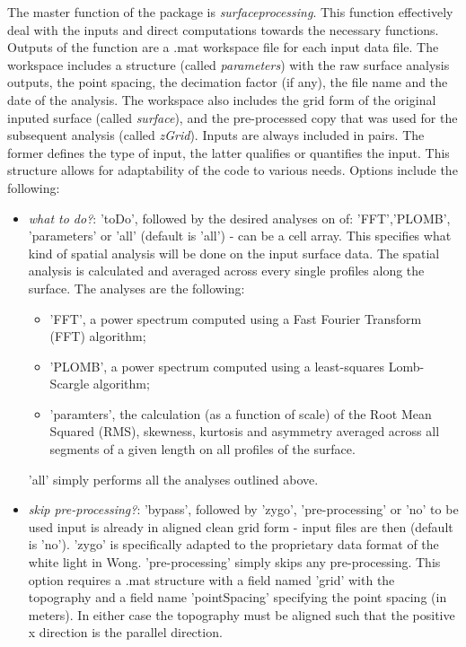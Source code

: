 \documentclass[12pt,a4paper]{article}
\begin{document}
\begin{itemize}
The master function of the package is \textit{surfaceprocessing}. This function effectively deal with the inputs and direct computations towards the necessary functions. Outputs of the function are a .mat workspace file for each input data file. The workspace includes a structure (called \textit{parameters}) with the raw surface analysis outputs, the point spacing, the decimation factor (if any), the file name and the date of the analysis. The workspace also includes the grid form of the original inputed surface (called \textit{surface}), and the pre-processed copy that was used for the subsequent analysis (called \textit{zGrid}).  Inputs are always included in pairs. The former defines the type of input, the latter qualifies or quantifies the input. This structure allows for adaptability of the code to various needs. Options include the following:

\begin{itemize}
\item \textit{what to do?}: 'toDo', followed by the desired analyses on of: 'FFT','PLOMB', 'parameters' or 'all' (default is 'all') - can be a cell array. This specifies what kind of spatial analysis will be done on the input surface data. The spatial analysis is calculated and averaged across every single profiles along the surface.  The analyses are the following:
	\begin{itemize}
	\item 'FFT', a power spectrum computed using a Fast Fourier Transform (FFT) algorithm; 
	\item 'PLOMB', a power spectrum computed using a least-squares Lomb-Scargle algorithm;
	\item 'paramters', the calculation (as a function of scale) of the Root Mean Squared (RMS), skewness, kurtosis and asymmetry averaged across all segments of a given length on all profiles of the surface.
	\end{itemize}

'all' simply performs all the analyses outlined above.

\item \textit{skip pre-processing?}: 'bypass', followed by 'zygo', 'pre-processing' or 'no' to  be used input is already in aligned clean grid form - input files are then (default is 'no'). 'zygo' is specifically adapted to the proprietary data format of the white light in Wong. 'pre-processing' simply skips any pre-processing. This option requires a .mat structure with a field named 'grid' with the topography and a field name 'pointSpacing' specifying the point spacing (in meters). In either case the topography must be aligned such that the positive x direction is the parallel direction.	


\end{itemize}
\end{itemize}
\end{document}
